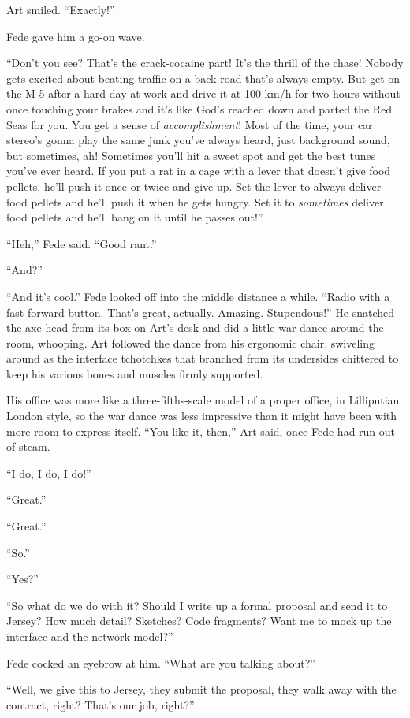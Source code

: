 Art smiled. “Exactly!”

Fede gave him a go-on wave.

“Don’t you see? That’s the crack-cocaine part! It’s the thrill of
the chase! Nobody gets excited about beating traffic on a back road
that’s always empty. But get on the M-5 after a hard day at work
and drive it at 100 km/h for two hours without once touching your
brakes and it’s like God’s reached down and parted the Red Seas for
you. You get a sense of \emph{accomplishment}! Most of the time,
your car stereo’s gonna play the same junk you’ve always heard,
just background sound, but sometimes, ah! Sometimes you’ll hit a
sweet spot and get the best tunes you’ve ever heard. If you put a
rat in a cage with a lever that doesn’t give food pellets, he’ll
push it once or twice and give up. Set the lever to always deliver
food pellets and he’ll push it when he gets hungry. Set it to
\emph{sometimes} deliver food pellets and he’ll bang on it until he
passes out!”

“Heh,” Fede said. “Good rant.”

“And?”

“And it’s cool.” Fede looked off into the middle distance a while.
“Radio with a fast-forward button. That’s great, actually. Amazing.
Stupendous!” He snatched the axe-head from its box on Art’s desk
and did a little war dance around the room, whooping. Art followed
the dance from his ergonomic chair, swiveling around as the
interface tchotchkes that branched from its undersides chittered to
keep his various bones and muscles firmly supported.

His office was more like a three-fifths-scale model of a proper
office, in Lilliputian London style, so the war dance was less
impressive than it might have been with more room to express
itself. “You like it, then,” Art said, once Fede had run out of
steam.

“I do, I do, I do!”

“Great.”

“Great.”

“So.”

“Yes?”

“So what do we do with it? Should I write up a formal proposal and
send it to Jersey? How much detail? Sketches? Code fragments? Want
me to mock up the interface and the network model?”

Fede cocked an eyebrow at him. “What are you talking about?”

“Well, we give this to Jersey, they submit the proposal, they walk
away with the contract, right? That’s our job, right?”

